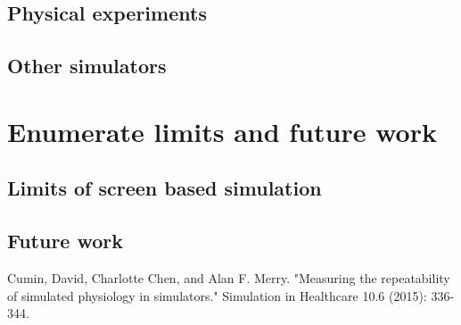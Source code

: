 \documentclass[a4paper]{article}
\begin{document}
\subsection{Physical experiments}
\subsection{Other simulators}

\section{Enumerate limits and future work}
\subsection{Limits of screen based simulation}
\subsection{Future work}

\begin{thebibliography}{1}

   Cumin, David, Charlotte Chen, and Alan F. Merry. "Measuring the repeatability of simulated physiology in simulators." Simulation in Healthcare 10.6 (2015): 336-344.




  \end{thebibliography}
\end{document}
